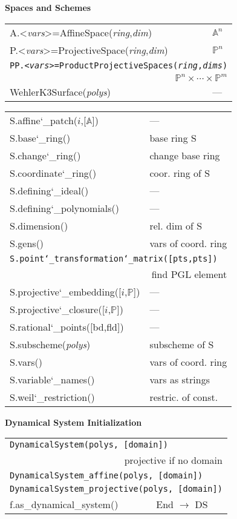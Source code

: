 \documentclass{amsart}
\newcommand{\Section}[1]{\filbreak\par\vspace{5pt}\noindent\textbf{#1}\par\noindent\ignorespaces}
\newcommand{\us}{\char`\_}  %
\begin{document}
\begin{multicols}{3}
\Section{Spaces and Schemes}
\noindent
\begin{tabular}{@{\ttfamily\enspace}ll}
A.<\textit{vars}>=AffineSpace(\textit{ring},\textit{dim}) & $\mathbb{A}^n$\\
P.<\textit{vars}>=ProjectiveSpace(\textit{ring},\textit{dim}) & $\mathbb{P}^n$\\
\multicolumn{2}{l}{\texttt{PP.<\textit{vars}>=ProductProjectiveSpaces(\textit{ring},\textit{dims})}}\\ \multicolumn{2}{r}{$\mathbb{P}^n \times \cdots \times \mathbb{P}^m$}\\
WehlerK3Surface(\textit{polys}) & ---
\end{tabular}
\noindent
\begin{tabular}{@{\ttfamily\enspace}ll}
S.affine\us patch($i$,[$\mathbb{A}$]) & ---\\
S.base\us ring() & base ring S\\
S.change\us ring() & change base ring\\
S.coordinate\us ring() & coor. ring of S\\
S.defining\us ideal() & ---\\
S.defining\us polynomials() & ---\\
S.dimension() & rel. dim of S\\
S.gens() & vars of coord. ring\\
\multicolumn{2}{l}{\texttt{S.point\us transformation\us matrix([pts,pts])}} \\ \multicolumn{2}{r}{find PGL element}\\
S.projective\us embedding([$i$,$\mathbb{P}$]) & ---\\
S.projective\us closure([$i$,$\mathbb{P}$])& --- \\
S.rational\us points([bd,fld]) & ---\\
S.subscheme(\textit{polys}) & subscheme of S\\
S.vars() & vars of coord. ring\\
S.variable\us names() & vars as strings\\
S.weil\us restriction() & restric. of const.
\end{tabular}

\Section{Dynamical System Initialization}
\noindent
\begin{tabular}{@{\ttfamily\enspace}ll}
\multicolumn{2}{l}{\texttt{DynamicalSystem(polys, [domain])}}\\
\multicolumn{2}{r}{projective if no domain}\\
\multicolumn{2}{l}{\texttt{DynamicalSystem\_affine(polys, [domain])}}\\
\multicolumn{2}{l}{\texttt{DynamicalSystem\_projective(polys, [domain])}}\\
f.as\_dynamical\_system() & End $\to$ DS
\end{tabular}


\end{multicols}
\end{document}
